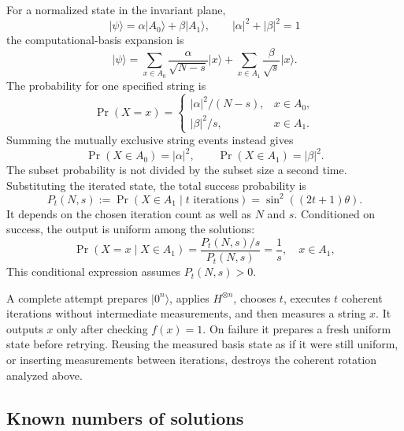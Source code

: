 \documentclass[11pt,oneside,openany]{book}
\providecommand{\ket}{}
\renewcommand{\ket}[1]{\lvert #1\rangle}
\theoremstyle{definition}
\begin{document}
For a normalized state in the invariant plane,
\begin{equation}
 \ket\psi=\alpha\ket{A_0}+\beta\ket{A_1},\qquad
 |\alpha|^2+|\beta|^2=1
\end{equation}
the computational-basis expansion is
\begin{equation}
 \ket\psi=\sum_{x\in A_0}\frac\alpha{\sqrt{N-s}}\ket x
 +\sum_{x\in A_1}\frac\beta{\sqrt s}\ket x.
\end{equation}
The probability for one specified string is
\begin{equation}
 \Pr(X=x)=
 \begin{cases}
 |\alpha|^2/(N-s),&x\in A_0,\\
 |\beta|^2/s,&x\in A_1.
 \end{cases}
 \label{eq:search-point-probability}
\end{equation}
Summing the mutually exclusive string events instead gives
\begin{equation}
 \Pr(X\in A_0)=|\alpha|^2,\qquad
 \Pr(X\in A_1)=|\beta|^2.
 \label{eq:search-set-probability}
\end{equation}
The subset probability is not divided by the subset size a second time. Substituting the iterated state, the total success probability is
\begin{equation}
 P_t(N,s):=\Pr(X\in A_1\mid t\text{ iterations})
 =\sin^2((2t+1)\theta).
 \label{eq:search-success}
\end{equation}
It depends on the chosen iteration count as well as $N$ and $s$. Conditioned on success, the output is uniform among the solutions:
\begin{equation}
 \Pr(X=x\mid X\in A_1)
 =\frac{P_t(N,s)/s}{P_t(N,s)}=\frac1s,
 \quad x\in A_1,
\end{equation}
This conditional expression assumes $P_t(N,s)>0$.

A complete attempt prepares $\ket{0^n}$, applies $H^{\otimes n}$, chooses $t$, executes $t$ coherent iterations without intermediate measurements, and then measures a string $x$. It outputs $x$ only after checking $f(x)=1$. On failure it prepares a fresh uniform state before retrying. Reusing the measured basis state as if it were still uniform, or inserting measurements between iterations, destroys the coherent rotation analyzed above.

\subsection{Known numbers of solutions}
\end{document}
